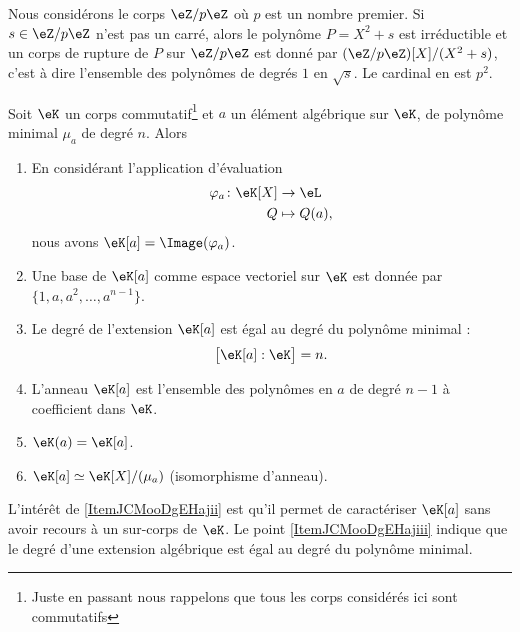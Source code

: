 \begin{example}
    Nous considérons le corps \( \eZ/p\eZ\) où \( p\) est un nombre premier. Si \( s\in \eZ/p\eZ\) n'est pas un carré, alors le polynôme \(P= X^2+s\) est irréductible et un corps de rupture de \( P\) sur \( \eZ/p\eZ\) est donné par \( (\eZ/p\eZ)[X]/(X^2+s)\), c'est à dire l'ensemble des polynômes de degrés \( 1\) en \( \sqrt{s}\). Le cardinal en est \( p^2\).
\end{example}

\begin{proposition}   \label{PropURZooVtwNXE}
    Soit \( \eK\) un corps commutatif\footnote{Juste en passant nous rappelons que tous les corps considérés ici sont commutatifs} et \( a\) un élément algébrique sur \( \eK\), de polynôme minimal \( \mu_a\) de degré \( n\). Alors
    \begin{enumerate}
        \item\label{ItemJCMooDgEHajmi}
            En considérant l'application d'évaluation
            \begin{equation}
                \begin{aligned}
                    \varphi_a\colon \eK[X]&\to \eL \\
                    Q&\mapsto Q(a), 
                \end{aligned}
            \end{equation}
            nous avons \( \eK[a]=\Image(\varphi_a)\).
        \item\label{ItemJCMooDgEHajiv}
            Une base de \( \eK[a]\) comme espace vectoriel sur \( \eK\) est donnée par \( \{ 1,a,a^2,\ldots, a^{n-1} \}\).
        \item\label{ItemJCMooDgEHajiii}
            Le degré de l'extension \( \eK[a]\) est égal au degré du polynôme minimal :
            \begin{equation}
                \big[ \eK[a]:\eK \big]=n.
            \end{equation}
         \item
            L'anneau \( \eK[a]\) est l'ensemble des polynômes en \( a\) de degré \( n-1\) à coefficient dans \( \eK\).
        \item\label{ItemJCMooDgEHaji}
            \( \eK(a)=\eK[a]\).
        \item   \label{ItemJCMooDgEHajii}
            \( \eK[a]\simeq\eK[X]/(\mu_a)\) (isomorphisme d'anneau).
    \end{enumerate}
\end{proposition}
L'intérêt de \ref{ItemJCMooDgEHajii} est qu'il permet de caractériser \( \eK[a]\) sans avoir recours à un sur-corps de \( \eK\). Le point \ref{ItemJCMooDgEHajiii} indique que le degré d'une extension algébrique est égal au degré du polynôme minimal.

